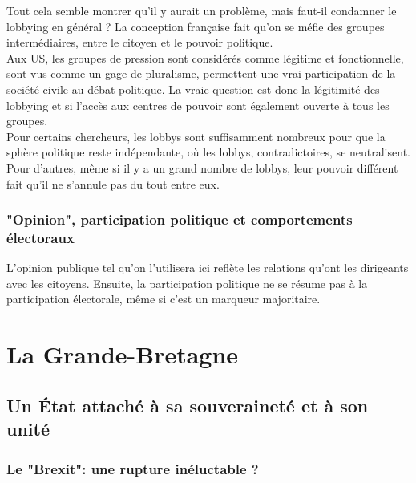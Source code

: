 \documentclass[10pt, a4paper, openany]{book}
\begin{document}
Tout cela semble montrer qu'il y aurait un problème, mais faut-il condamner le lobbying en général ? La conception française fait qu'on se méfie des groupes intermédiaires, entre le citoyen et le pouvoir politique. \\
Aux US, les groupes de pression sont considérés comme légitime et fonctionnelle, sont vus comme un gage de pluralisme, permettent une vrai participation de la société civile au débat politique. La vraie question est donc la légitimité des lobbying et si l'accès aux centres de pouvoir sont également ouverte à tous les groupes. \\
Pour certains chercheurs, les lobbys sont suffisamment nombreux pour que la sphère politique reste indépendante, où les lobbys, contradictoires, se neutralisent. Pour d'autres, même si il y a un grand nombre de lobbys, leur pouvoir différent fait qu'il ne s'annule pas du tout entre eux.

\subsection{"Opinion", participation politique et comportements électoraux}

L'opinion publique tel qu'on l'utilisera ici reflète les relations qu'ont les dirigeants avec les citoyens. Ensuite, la participation politique ne se résume pas à la participation électorale, même si c'est un marqueur majoritaire. 


\chapter{La Grande-Bretagne}

\section{Un État attaché à sa souveraineté et à son unité}

\subsection{Le "Brexit": une rupture inéluctable ?}
\end{document}
